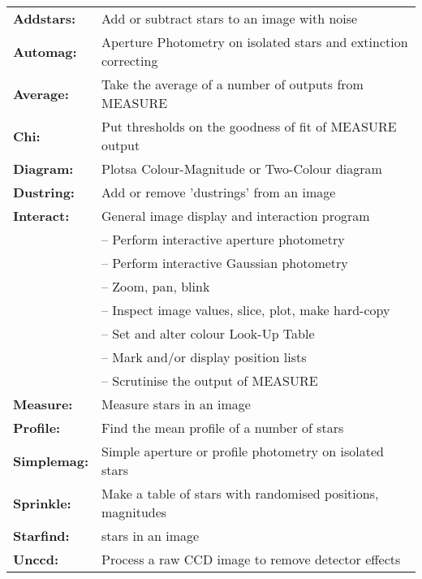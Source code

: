 \label{ap:summary}
\begin{tabular}{ll}
{\bf  Addstars:} &	Add or subtract stars to an image with noise \\
{\bf  Automag:} &	Aperture Photometry on isolated stars and extinction correcting \\
{\bf  Average:} &	Take the average of a number of outputs from MEASURE \\
{\bf  Chi:} &		Put thresholds on the goodness of fit of MEASURE output \\
{\bf  Diagram:} &	Plotsa Colour-Magnitude or Two-Colour diagram \\
{\bf  Dustring:} &      Add or remove 'dustrings' from an image \\
{\bf  Interact:} &      General image display and interaction program \\
                 &      \hspace{2ex} -- Perform interactive aperture photometry \\
                 &      \hspace{2ex} -- Perform interactive Gaussian photometry \\
                 &      \hspace{2ex} -- Zoom, pan, blink\\
                 &      \hspace{2ex} -- Inspect image values, slice, plot,  make hard-copy\\
                 &      \hspace{2ex} -- Set and alter colour Look-Up Table \\
                 &      \hspace{2ex} -- Mark and/or display position lists \\
                 &      \hspace{2ex} -- Scrutinise the output of MEASURE \\
{\bf  Measure:} &	Measure stars in an image \\
{\bf  Profile:} &	Find the mean profile of a number of stars \\
{\bf  Simplemag:} &	Simple aperture or profile photometry on isolated stars \\
{\bf  Sprinkle:} &      Make a table of stars with randomised positions, magnitudes \\
{\bf  Starfind:} &	stars in an image \\
{\bf  Unccd:} &         Process a raw CCD image to remove detector effects \\
\end{tabular}

